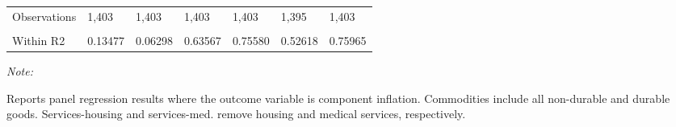 \begin{table}
{\begin{threeparttable}
\begin{tabular}[t]{lllllll}
\addlinespace
Observations & 1,403 & 1,403 & 1,403 & 1,403 & 1,395 & 1,403\\
\addlinespace
\cellcolor{gray!6}{R2} & \cellcolor{gray!6}{0.93427} & \cellcolor{gray!6}{0.90606} & \cellcolor{gray!6}{0.98658} & \cellcolor{gray!6}{0.95034} & \cellcolor{gray!6}{0.93093} & \cellcolor{gray!6}{0.94738}\\
\addlinespace
Within R2 & 0.13477 & 0.06298 & 0.63567 & 0.75580 & 0.52618 & 0.75965\\
\bottomrule
\end{tabular}
\begin{tablenotes}
\item \textit{Note: } 
\item Reports panel regression results where the outcome variable is component inflation. Commodities include all non-durable and durable goods.  Services-housing and services-med. remove housing and medical services, respectively.
\end{tablenotes}
\end{threeparttable}}
\end{table}
